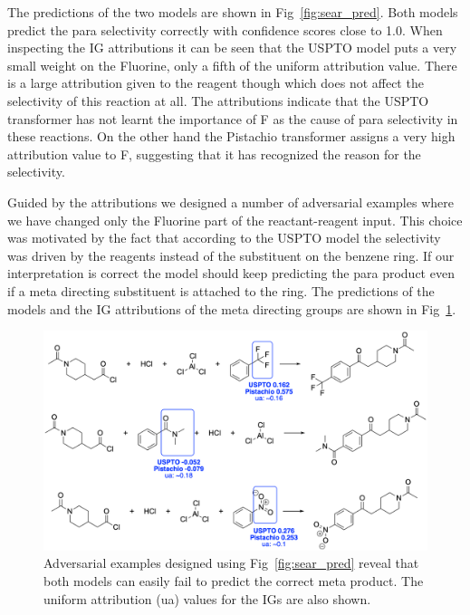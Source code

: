 The predictions of the two models are shown in Fig~\ref{fig:sear_pred}. Both models predict the para selectivity correctly with confidence scores close to 1.0. When inspecting the IG attributions it can be seen that the USPTO model puts a very small weight on the Fluorine, only a fifth of the uniform attribution value. There is a large attribution given to the reagent though which does not affect the selectivity of this reaction at all. The attributions indicate that the USPTO transformer has not learnt the importance of F as the cause of para selectivity in these reactions. On the other hand the Pistachio transformer assigns a very high attribution value to F, suggesting that it has recognized the reason for the selectivity. 

Guided by the attributions we designed a number of adversarial examples where we have changed only the Fluorine part of the reactant-reagent input. This choice was motivated by the fact that according to the USPTO model the selectivity was driven by the reagents instead of the substituent on the benzene ring. If our interpretation is correct the model should keep predicting the para product even if a meta directing substituent is attached to the ring. The predictions of the models and the IG attributions of the meta directing groups are shown in Fig~\ref{fig:sear_adv}.

\begin{figure}[htbp!] 
\centering    
\includegraphics[width=1.0\textwidth]{Chapters/Ch4/Figs/sear_adv.png}
\caption[FC IG]{Adversarial examples designed using Fig~\ref{fig:sear_pred} reveal that both models can easily fail to predict the correct meta product. The uniform attribution (ua) values for the IGs are also shown. }
\label{fig:sear_adv}
\end{figure}

